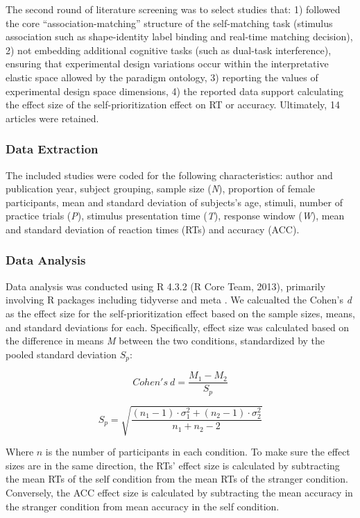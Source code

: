 \documentclass[
  english,
  man,floatsintext]{apa6}
\begin{document}
The second round of literature screening was to select studies that: 1) followed the core ``association-matching'' structure of the self-matching task (stimulus association such as shape-identity label binding and real-time matching decision), 2) not embedding additional cognitive tasks (such as dual-task interference), ensuring that experimental design variations occur within the interpretative elastic space allowed by the paradigm ontology, 3) reporting the values of experimental design space dimensions, 4) the reported data support calculating the effect size of the self-prioritization effect on RT or accuracy. Ultimately, 14 articles were retained.

\subsubsection{Data Extraction}\label{data-extraction}

The included studies were coded for the following characteristics: author and publication year, subject grouping, sample size (\emph{N}), proportion of female participants, mean and standard deviation of subjects's age, stimuli, number of practice trials (\emph{P}), stimulus presentation time (\emph{T}), response window (\emph{W}), mean and standard deviation of reaction times (RTs) and accuracy (ACC).

\subsubsection{Data Analysis}\label{data-analysis}

Data analysis was conducted using R 4.3.2 (R Core Team, 2013), primarily involving R packages including tidyverse and meta . We calcualted the Cohen's \emph{d} as the effect size for the self-prioritization effect based on the sample sizes, means, and standard deviations for each. Specifically, effect size was calculated based on the difference in means \emph{M} between the two conditions, standardized by the pooled standard deviation \(S_p\):

\[Cohen's\ d = \frac{M_1 - M_2}{S_p}\]

\[S_p = \sqrt{\frac{(n_1 - 1) \cdot \sigma_1^2 + (n_2 - 1) \cdot \sigma_2^2}{n_1 + n_2 - 2}}\]

Where \(n\) is the number of participants in each condition. To make sure the effect sizes are in the same direction, the RTs' effect size is calculated by subtracting the mean RTs of the self condition from the mean RTs of the stranger condition. Conversely, the ACC effect size is calculated by subtracting the mean accuracy in the stranger condition from mean accuracy in the self condition.
\end{document}
